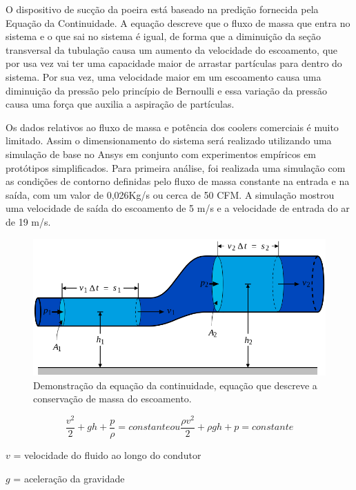 		O dispositivo de sucção da poeira está baseado na predição fornecida pela Equação da Continuidade. A equação descreve que o fluxo de massa que entra no sistema e o que sai no sistema é igual, de forma que a diminuição da seção transversal da tubulação causa um aumento da velocidade do escoamento, que por usa vez vai ter uma capacidade maior de arrastar partículas para dentro do sistema. Por sua vez, uma velocidade maior em um escoamento causa uma diminuição da pressão pelo princípio de Bernoulli e essa variação da pressão causa uma força que auxilia a aspiração de partículas.

		Os dados relativos ao fluxo de massa e potência dos coolers comerciais é muito limitado. Assim o dimensionamento do sistema será realizado utilizando uma simulação de base no Ansys em conjunto com experimentos empíricos em protótipos simplificados. Para primeira análise, foi realizada uma simulação com as condições de contorno definidas pelo fluxo de massa constante na entrada e na saída, com um valor de 0,026Kg/s ou  cerca de 50 CFM. A simulação mostrou uma velocidade de saída do escoamento de 5 m/s e a velocidade de entrada do ar de 19 m/s.

		\begin{figure}[H]
			\centering
			\includegraphics[scale=0.4]{figuras/succao.png}
			\caption{Demonstração da equação da continuidade, equação que descreve a conservação de massa do escoamento.}
			\label{img:succao}
		\end{figure}

		\begin{equation}\label{1}
		\frac{v^{2}}{2} + gh + \frac{p}{\rho} = constante ou \frac{\rho v^{2}}{2} + \rho gh + p = constante
		\end{equation}

		$v$ = velocidade do fluido ao longo do condutor

		$g$ = aceleração da gravidade
		
